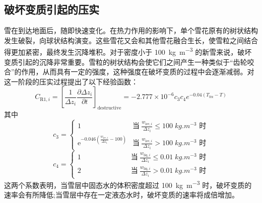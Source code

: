 \subsection{破坏变质引起的压实}
雪在到达地面后，随即快速变化。在热力作用的影响下，单个雪花原有的树状结构发生破裂，向球状结构演变。这些雪花又会和其他雪花融合生长，使雪粒之间结合得更加紧密，最终发生沉降堆积。对于密度小于 \qty{100}{kg.m^{-3}} 的新雪来说，破坏变质引起的沉降非常重要。雪粒的树状结构会使它们之间产生一种类似于“齿轮咬合”的作用，从而具有一定的强度，这种强度在破坏变质的过程中会逐渐减弱。\citet{anderson1976point}对这一阶段的压实过程提出了以下经验函数：
\begin{equation}\label{eq:DestruciveCompact}
  C_{\mathrm{R1},i}=\left[\frac{1}{\Delta {z_i}} \frac{\partial \Delta {z_i}}{\partial {t}}\right]_{\text {destructive}}=-2.777 \times 10^{-6} {c}_{3} {c}_{4} {e}^{-0.04\left(T_{\mathrm {frz}} -T\right)}
\end{equation}
其中
\begin{equation}
  c_3=\begin{cases}
    1 &\text{当}\ \frac{w_{\mathrm{ice},i}}{\Delta z_i} \leqslant 100 \;\unit{kg.m^{-3}}\text{ 时} \\
    {\mathrm e}^{-0.046\left(\frac{w_{\mathrm{ice},i}}{\Delta z_i}-100\right)} &\text{当}\ \frac{w_{\mathrm{ice},i}}{\Delta z_i}>100 \;\unit{kg.m^{-3}}\text{ 时}
  \end{cases}
\end{equation}
\begin{equation}
  c_4=\begin{cases}
    1 &\qquad \quad \qquad \quad \;\text{当}\ \frac{w_{\mathrm{liq},i}}{\Delta z_i} \leqslant 0.01 \;\unit{kg.m^{-3}}\text{ 时} \\
    2 &\qquad \quad \qquad \quad \;\text{当}\ \frac{w_{\mathrm{liq},i}}{\Delta z_i}>0.01 \;\unit{kg.m^{-3}}\text{ 时}
  \end{cases}
\end{equation}
这两个系数表明，当雪层中固态水的体积密度超过 \qty{100}{kg.m^{-3}} 时，破坏变质的速率会有所降低;当雪层中存在一定液态水时，破坏变质的速率将成倍增加。

